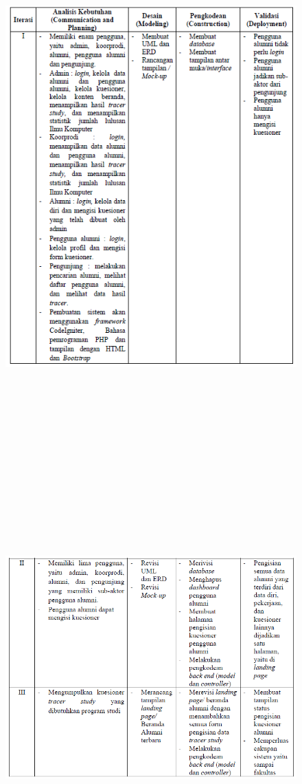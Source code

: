 \begin{figure}[H]
	\centering
	\includegraphics[width=15cm,height=18cm]{gambar/dokumentasi_spiral}
	\label{dokumentasi}
\end{figure}

\begin{figure}[H]
	\centering
	\includegraphics[width=15cm,height=18cm]{gambar/dokumentasi_spiral2}
	\label{dokumentasi2}
\end{figure}